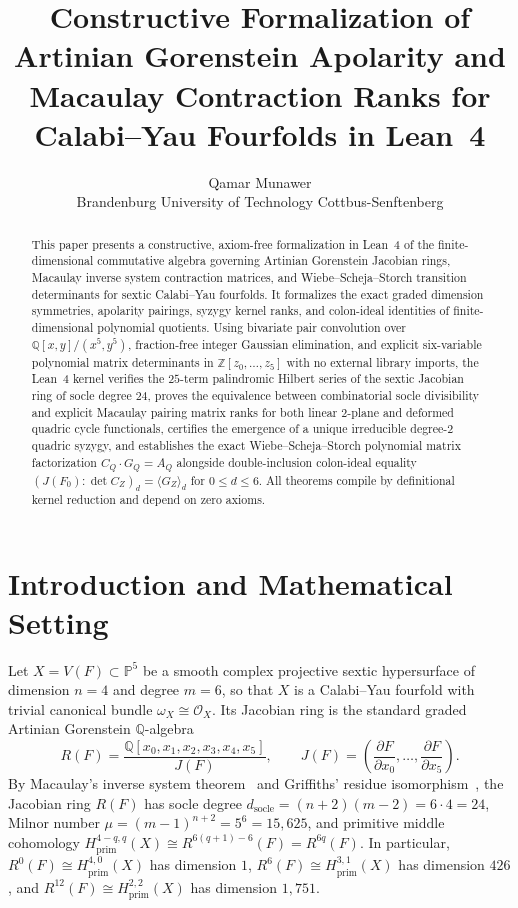 \documentclass[11pt,a4paper]{article}
\title{\textbf{Constructive Formalization of Artinian Gorenstein Apolarity and Macaulay Contraction Ranks for Calabi--Yau Fourfolds in Lean~4}}
\author{Qamar Munawer \\ Brandenburg University of Technology Cottbus-Senftenberg}
\date{}
\begin{document}
\maketitle

\begin{abstract}
This paper presents a constructive, axiom-free formalization in Lean~4 of the finite-dimensional commutative algebra governing Artinian Gorenstein Jacobian rings, Macaulay inverse system contraction matrices, and Wiebe--Scheja--Storch transition determinants for sextic Calabi--Yau fourfolds. It formalizes the exact graded dimension symmetries, apolarity pairings, syzygy kernel ranks, and colon-ideal identities of finite-dimensional polynomial quotients. Using bivariate pair convolution over $\mathbb{Q}[x,y]/(x^5,y^5)$, fraction-free integer Gaussian elimination, and explicit six-variable polynomial matrix determinants in $\mathbb{Z}[z_0,\dots,z_5]$ with no external library imports, the Lean~4 kernel verifies the $25$-term palindromic Hilbert series of the sextic Jacobian ring of socle degree $24$, proves the equivalence between combinatorial socle divisibility and explicit Macaulay pairing matrix ranks for both linear $2$-plane and deformed quadric cycle functionals, certifies the emergence of a unique irreducible degree-$2$ quadric syzygy, and establishes the exact Wiebe--Scheja--Storch polynomial matrix factorization $C_Q \cdot G_Q = A_Q$ alongside double-inclusion colon-ideal equality $(J(F_0) : \det C_Z)_d = \langle G_Z \rangle_d$ for $0 \le d \le 6$. All theorems compile by definitional kernel reduction and depend on zero axioms.
\end{abstract}

\section{Introduction and Mathematical Setting}

Let $X = V(F) \subset \mathbb{P}^5$ be a smooth complex projective sextic hypersurface of dimension $n = 4$ and degree $m = 6$, so that $X$ is a Calabi--Yau fourfold with trivial canonical bundle $\omega_X \cong \mathcal{O}_X$. Its Jacobian ring is the standard graded Artinian Gorenstein $\mathbb{Q}$-algebra
\begin{equation}
  R(F) = \frac{\mathbb{Q}[x_0, x_1, x_2, x_3, x_4, x_5]}{J(F)}, \qquad J(F) = \left(\frac{\partial F}{\partial x_0}, \dots, \frac{\partial F}{\partial x_5}\right).
\end{equation}
By Macaulay's inverse system theorem~\cite{Macaulay1916} and Griffiths' residue isomorphism~\cite{Griffiths1969,CarlsonGriffiths1980}, the Jacobian ring $R(F)$ has socle degree $d_{\mathrm{socle}} = (n + 2)(m - 2) = 6 \cdot 4 = 24$, Milnor number $\mu = (m - 1)^{n+2} = 5^6 = 15{,}625$, and primitive middle cohomology $H^{4-q,q}_{\mathrm{prim}}(X) \cong R^{6(q+1)-6}(F) = R^{6q}(F)$. In particular, $R^0(F) \cong H^{4,0}_{\mathrm{prim}}(X)$ has dimension $1$, $R^6(F) \cong H^{3,1}_{\mathrm{prim}}(X)$ has dimension $426$, and $R^{12}(F) \cong H^{2,2}_{\mathrm{prim}}(X)$ has dimension $1{,}751$.
\end{document}
